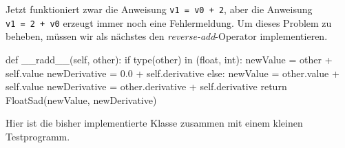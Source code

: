 \documentclass[
  letterpaper,
  DIV=11,
  oneside]{scrreprt}
\newenvironment{Shaded}{\begin{snugshade}}{\end{snugshade}}
\newcommand{\BuiltInTok}[1]{\textcolor[rgb]{0.00,0.23,0.31}{#1}}
\newcommand{\ControlFlowTok}[1]{\textcolor[rgb]{0.00,0.23,0.31}{#1}}
\newcommand{\FloatTok}[1]{\textcolor[rgb]{0.68,0.00,0.00}{#1}}
\newcommand{\FunctionTok}[1]{\textcolor[rgb]{0.28,0.35,0.67}{#1}}
\newcommand{\KeywordTok}[1]{\textcolor[rgb]{0.00,0.23,0.31}{#1}}
\newcommand{\NormalTok}[1]{\textcolor[rgb]{0.00,0.23,0.31}{#1}}
\newcommand{\OperatorTok}[1]{\textcolor[rgb]{0.37,0.37,0.37}{#1}}
\newcommand{\VariableTok}[1]{\textcolor[rgb]{0.07,0.07,0.07}{#1}}
\theoremstyle{definition}
\theoremstyle{definition}
\theoremstyle{remark}
\begin{document}
Jetzt funktioniert zwar die Anweisung \texttt{v1\ =\ v0\ +\ 2}, aber die
Anweisung \texttt{v1\ =\ 2\ +\ v0} erzeugt immer noch eine
Fehlermeldung. Um dieses Problem zu beheben, müssen wir als nächstes den
\emph{reverse-add}-Operator implementieren.

\begin{Shaded}
\begin{Highlighting}[]
\KeywordTok{def} \FunctionTok{\_\_radd\_\_}\NormalTok{(}\VariableTok{self}\NormalTok{, other):}
    \ControlFlowTok{if} \BuiltInTok{type}\NormalTok{(other) }\KeywordTok{in}\NormalTok{ (}\BuiltInTok{float}\NormalTok{, }\BuiltInTok{int}\NormalTok{):}
\NormalTok{        newValue }\OperatorTok{=}\NormalTok{ other }\OperatorTok{+} \VariableTok{self}\NormalTok{.value}
\NormalTok{        newDerivative }\OperatorTok{=} \FloatTok{0.0} \OperatorTok{+} \VariableTok{self}\NormalTok{.derivative}
    \ControlFlowTok{else}\NormalTok{:}
\NormalTok{        newValue }\OperatorTok{=}\NormalTok{ other.value }\OperatorTok{+} \VariableTok{self}\NormalTok{.value}
\NormalTok{        newDerivative }\OperatorTok{=}\NormalTok{ other.derivative }\OperatorTok{+} \VariableTok{self}\NormalTok{.derivative}
    \ControlFlowTok{return}\NormalTok{ FloatSad(newValue, newDerivative)}
\end{Highlighting}
\end{Shaded}

Hier ist die bisher implementierte Klasse zusammen mit einem kleinen
Testprogramm.
\end{document}
